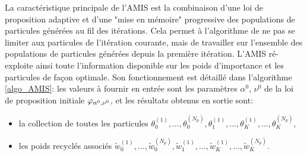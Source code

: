 {La caractéristique principale de l'AMIS est la combinaison d'une loi de proposition adaptive et d'une "mise en mémoire" progressive des populations de particules générées au fil des itérations. Cela permet à l'algorithme de ne pas se limiter aux particules de l'itération courante, mais de travailler sur l'ensemble des populations de particules générées depuis la première itération. L'AMIS ré-exploite ainsi toute l'information disponible sur les poids d'importance et les particules de façon optimale. Son fonctionnement est détaillé dans l'algorithme \ref{algo_AMIS}: les valeurs à fournir en entrée sont  les paramètres $\alpha^0$, $\nu^0$ de la loi de proposition initiale ${\varphi}_{\alpha^0, \nu^0}$, et les résultats obtenus en sortie sont:
	\begin{itemize}
	 \item la collection de toutes les particules $\theta_0^{(1)}, \dots, \theta_0^{(N_p)}, \theta_1^{(1)}, \dots, \theta_K^{(1)}, \dots, \theta_K^{(N_p)}$,
	 \item les poids recyclés associés $\tilde{w}_0^{(1)}, \dots, \tilde{w}_0^{(N_p)}, \tilde{w}_1^{(1)}, \dots, \tilde{w}_K^{(1)}, \dots, \tilde{w}_K^{(N_p)}$.\\
	 \end{itemize}
} 


